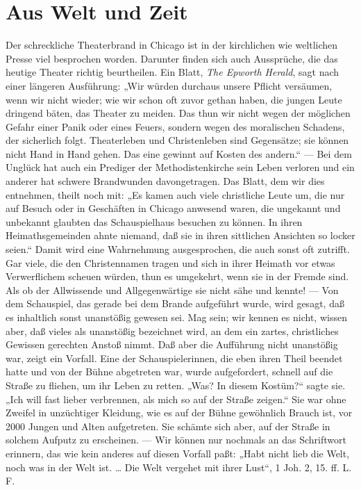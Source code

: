 \chapter{Aus Welt und Zeit}

Der schreckliche Theaterbrand in Chicago ist in der kirchlichen wie weltlichen Presse viel besprochen worden. Darunter finden sich auch Aussprüche, die das heutige Theater richtig beurtheilen. Ein Blatt, \emph{The Epworth Herald}, sagt nach einer längeren Ausführung: „Wir würden durchaus unsere Pflicht versäumen, wenn wir nicht wieder; wie wir schon oft zuvor gethan haben, die jungen Leute dringend bäten, das Theater zu meiden. Das thun wir nicht wegen der möglichen Gefahr einer Panik oder eines Feuers, sondern wegen des moralischen Schadens, der sicherlich folgt. Theaterleben und Christenleben sind Gegensätze; sie können nicht Hand in Hand gehen. Das eine gewinnt auf Kosten des andern.“ — Bei dem Unglück hat auch ein Prediger der Methodistenkirche sein Leben verloren und ein anderer hat schwere Brandwunden davongetragen. Das Blatt, dem wir dies entnehmen, theilt noch mit: „Es kamen auch viele christliche Leute um, die nur auf Besuch oder in Geschäften in Chicago anwesend waren, die ungekannt und unbekannt glaubten das Schauspielhaus besuchen zu können. In ihren Heimathsgemeinden ahnte niemand, daß sie in ihren sittlichen Ansichten so locker seien.“ Damit wird eine Wahrnehmung ausgesprochen, die auch sonst oft zutrifft. Gar viele, die den Christennamen tragen und sich in ihrer Heimath vor etwas Verwerflichem scheuen würden, thun es umgekehrt, wenn sie in der Fremde sind. Als ob der Allwissende und Allgegenwärtige sie nicht sähe und kennte! — Von dem Schauspiel, das gerade bei dem Brande aufgeführt
wurde, wird gesagt, daß es inhaltlich sonst unanstößig gewesen sei. Mag sein; wir kennen es nicht, wissen aber, daß vieles als unanstößig bezeichnet wird, an dem ein zartes, christliches Gewissen gerechten Anstoß nimmt. Daß aber die Aufführung nicht unanstößig war, zeigt ein Vorfall. Eine der Schauspielerinnen, die eben ihren Theil beendet hatte und von der Bühne abgetreten war, wurde aufgefordert, schnell auf die Straße zu fliehen, um ihr Leben zu retten. „Was? In diesem Kostüm?“ sagte sie. „Ich will fast lieber verbrennen, als mich so auf der Straße zeigen.“ Sie war ohne Zweifel in unzüchtiger Kleidung, wie es auf der Bühne gewöhnlich Brauch ist, vor 2000 Jungen und Alten aufgetreten. Sie schämte sich aber, auf der Straße in solchem Aufputz zu erscheinen. — Wir können nur nochmals an das Schriftwort erinnern, das wie kein anderes auf diesen Vorfall paßt: „Habt nicht lieb die Welt, noch was in der Welt ist. … Die Welt vergehet mit ihrer Lust“, 1 Joh. 2, 15. ff. L. F.

